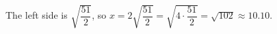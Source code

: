 The left side is $\sqrt{\dfrac{51}{2}}$, so $x=2\sqrt{\dfrac{51}{2}}=\sqrt{4\cdot\dfrac{51}{2}}=\boxed{\sqrt{102}}\approx10.10$.
